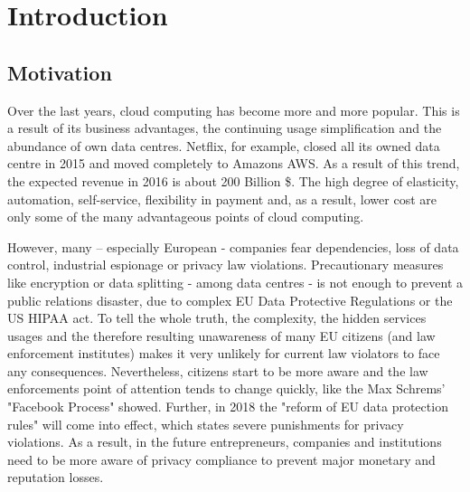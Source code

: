 
\chapter{Introduction}
\label{ch:Introduction}


\section{Motivation}
\label{sec:Introduction:motivation}

Over the last years, cloud computing has become more and more popular. This is a result of its business advantages, the continuing usage simplification and the abundance of own data centres. Netflix, for example, closed all its owned data centre in 2015 and moved completely to Amazons AWS\cite{DavidChernicoff.2015}. As a result of this trend, the expected revenue in 2016 is about 200 Billion \$\cite{statista.com.2016}. The high degree of elasticity, automation, self-service, flexibility in payment and, as a result, lower cost are only some of the many advantageous points of cloud computing.\cite{Binz.2014}

However, many – especially European - companies fear dependencies, loss of data control, industrial espionage or privacy law violations. Precautionary measures like encryption or data splitting - among data centres - is not enough to prevent a public relations disaster, due to complex EU Data Protective Regulations\cite{personaldata.2011} or the US HIPAA act\cite{OfficeforCivilRights.20130726}. To tell the whole truth, the complexity, the hidden services usages and the therefore resulting unawareness of many EU citizens (and law enforcement institutes) makes it very unlikely for current law violators to face any consequences. Nevertheless, citizens start to be more aware and the law enforcements point of attention tends to change quickly, like the Max Schrems' "Facebook Process" showed\cite{JuliaBahr.20150923}. Further, in 2018 the "reform of EU data protection rules" will come into effect, which states severe punishments for privacy violations\cite{personaldata.2011}. As a result, in the future entrepreneurs, companies and institutions need to be more aware of privacy compliance to prevent major monetary and reputation losses. 

